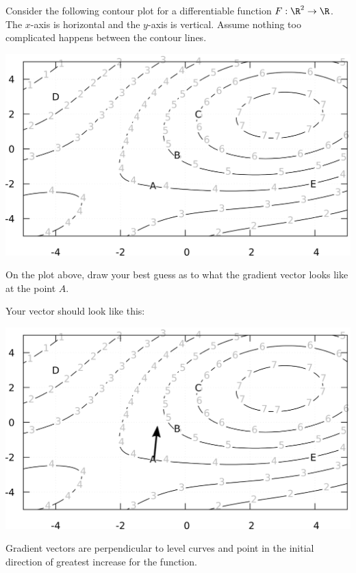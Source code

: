 \documentclass{ximera}
\author{Jim Fowler and Bart Snapp}
\begin{document}
Consider the following contour plot for a differentiable function $F :
\R^2 \to \R$.  The $x$-axis is horizontal and the $y$-axis is
vertical.  Assume nothing too complicated happens between the contour
lines.
\begin{image}[6in]
\includegraphics{contourPlot.png}
\end{image}

\begin{problem}
On the plot above, draw your best guess as to what the gradient vector looks like at the point $A$.
\begin{prompt}
  \begin{multipleChoice}
\end{multipleChoice}
  \begin{feedback}
    Your vector should look like this:
    \begin{image}
      \includegraphics{contourWithGrad.png}
    \end{image}
    Gradient vectors are perpendicular to level curves and point in the initial direction of greatest increase for the function.
  \end{feedback}
\end{prompt}
\end{problem}
\end{document}
